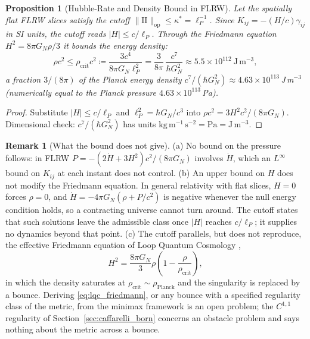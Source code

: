 \documentclass[11pt,a4paper,reqno]{amsart}
\newtheorem{proposition}[theorem]{Proposition}
\theoremstyle{definition}
\newtheorem{remark}[theorem]{Remark}
\numberwithin{equation}{section}
\newcommand{\II}{\mathrm{I\!I}}
\newcommand{\Pl}{\mathrm{Planck}}
\begin{document}
\begin{proposition}[Hubble-Rate and Density Bound in FLRW]
\label{thm:planck_bounce}
Let the spatially flat FLRW slices satisfy the cutoff $\|\II\|_{\mathrm{op}} \le \kappa^* = \ell_P^{-1}$. Since $K_{ij} = -(H/c)\gamma_{ij}$ in SI units, the cutoff reads $|H| \le c/\ell_P$. Through the Friedmann equation $H^2 = 8\pi G_N \rho/3$ it bounds the energy density:
\begin{equation}
    \label{eq:planck_pressure_top}
    \rho c^2 \le \rho_{\mathrm{crit}} c^2 \coloneqq \frac{3c^4}{8\pi G_N \ell_P^2} = \frac{3}{8\pi}\,\frac{c^7}{\hbar G_N^2} \approx 5.5 \times 10^{112}\ \mathrm{J\,m^{-3}},
\end{equation}
a fraction $3/(8\pi)$ of the Planck energy density $c^7/(\hbar G_N^2) \approx 4.63 \times 10^{113}$\,J\,m$^{-3}$ (numerically equal to the Planck pressure $4.63 \times 10^{113}$\,Pa).
\end{proposition}
\begin{proof}
Substitute $|H| \le c/\ell_P$ and $\ell_P^2 = \hbar G_N/c^3$ into $\rho c^2 = 3H^2c^2/(8\pi G_N)$. Dimensional check: $c^7/(\hbar G_N^2)$ has units $\mathrm{kg\,m^{-1}\,s^{-2}} = \mathrm{Pa} = \mathrm{J\,m^{-3}}$.
\end{proof}

\begin{remark}[What the bound does not give]
\label{rem:bounce_scope}
(a) No bound on the pressure follows: in FLRW $P = -(2\dot H + 3H^2)c^2/(8\pi G_N)$ involves $\dot H$, which an $L^\infty$ bound on $K_{ij}$ at each instant does not control.
(b) An upper bound on $H$ does not modify the Friedmann equation. In general relativity with flat slices, $H = 0$ forces $\rho = 0$, and $\dot H = -4\pi G_N(\rho + P/c^2)$ is negative whenever the null energy condition holds, so a contracting universe cannot turn around. The cutoff states that such solutions leave the admissible class once $|H|$ reaches $c/\ell_P$; it supplies no dynamics beyond that point.
(c) The cutoff parallels, but does not reproduce, the effective Friedmann equation of Loop Quantum Cosmology \cite{ashtekar2006quantum},
\begin{equation}
    \label{eq:lqc_friedmann}
    H^2 = \frac{8\pi G_N}{3} \rho \left( 1 - \frac{\rho}{\rho_{\mathrm{crit}}} \right),
\end{equation}
in which the density saturates at $\rho_{\mathrm{crit}} \sim \rho_{\Pl}$ and the singularity is replaced by a bounce. Deriving \eqref{eq:lqc_friedmann}, or any bounce with a specified regularity class of the metric, from the minimax framework is an open problem; the $C^{1,1}$ regularity of Section~\ref{sec:caffarelli_born} concerns an obstacle problem and says nothing about the metric across a bounce.
\end{remark}
\end{document}

